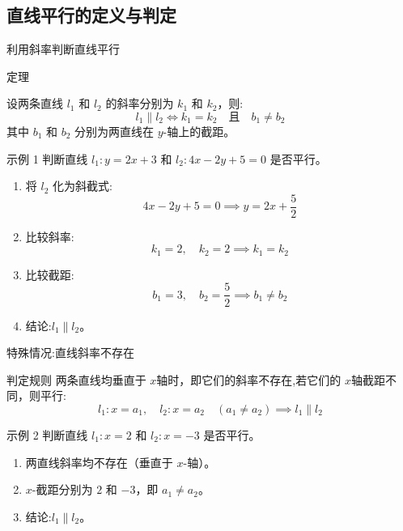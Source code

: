 


\subsection{直线平行的定义与判定}

\begin{frame}{利用斜率判断直线平行}
    \begin{block}{定理}

      设两条直线 \( l_1 \) 和 \( l_2 \) 的斜率分别为 \( k_1 \) 和 \( k_2 \)，则:
      \[
      l_1 \parallel l_2 \iff k_1 = k_2 \quad \text{且} \quad b_1 \neq b_2
      \]
      其中 \( b_1 \) 和 \( b_2 \) 分别为两直线在 \( y \)-轴上的截距。
    \end{block}
  \end{frame}

  \begin{frame}
    \begin{exampleblock}{示例 1}
      判断直线 \( l_1: y = 2x + 3 \) 和 \( l_2: 4x - 2y + 5 = 0 \) 是否平行。
      \begin{enumerate}
        \item 将 \( l_2 \) 化为斜截式:
          \[
          4x - 2y + 5 = 0 \implies y = 2x + \frac{5}{2}
          \]
        \item 比较斜率:
          \[
          k_1 = 2, \quad k_2 = 2 \implies k_1 = k_2
          \]
        \item 比较截距:
          \[
          b_1 = 3, \quad b_2 = \frac{5}{2} \implies b_1 \neq b_2
          \]
        \item 结论:\( l_1 \parallel l_2 \)。
      \end{enumerate}
    \end{exampleblock}
  \end{frame}


  \begin{frame}{特殊情况:直线斜率不存在}
    \begin{block}{判定规则}
      两条直线均垂直于 \( x \)轴时，即它们的斜率不存在,若它们的 \( x \)轴截距不同，则平行:
      \[
      l_1: x = a_1, \quad l_2: x = a_2 \quad (a_1 \neq a_2) \implies l_1 \parallel l_2
      \]
    \end{block}

    \begin{exampleblock}{示例 2}
      判断直线 \( l_1: x = 2 \) 和 \( l_2: x = -3 \) 是否平行。
      \begin{enumerate}
        \item 两直线斜率均不存在（垂直于 \( x \)-轴）。
        \item \( x \)-截距分别为 \( 2 \) 和 \( -3 \)，即 \( a_1 \neq a_2 \)。
        \item 结论:\( l_1 \parallel l_2 \)。
      \end{enumerate}
    \end{exampleblock}
  \end{frame}

